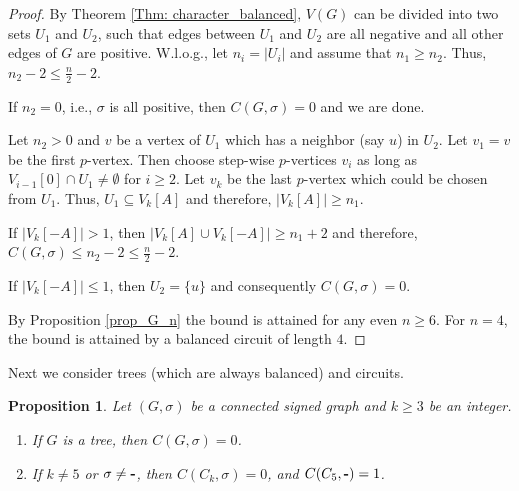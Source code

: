 \documentclass[a4paper,11pt]{article}
\newtheorem{prop}[defi]{Proposition}
\theoremstyle{remark}
\begin{document}
\begin{proof}
    By Theorem \ref{Thm: character_balanced}, $V(G)$ can be divided into two sets $U_1$ and $U_2$, such that edges between $U_1$ and $U_2$ are all negative and 
    all other edges of $G$ are positive. W.l.o.g., let $n_i = |U_i|$ and assume that $n_1 \geq n_2$. Thus, $n_2 - 2 \leq \frac{n}{2}-2$.

    If $n_2 = 0$, i.e., $\sigma$ is all positive, then $C(G,\sigma) = 0$ and we are done. 

    Let $n_2 > 0$ and $v$ be a vertex of $U_1$ which has a neighbor (say $u$) in $U_2$. 
    Let $v_1=v$ be the first $p$-vertex.  
    Then choose step-wise $p$-vertices $v_i$ as long as $V_{i-1}[0]\cap U_1 \neq \emptyset$ for $i\geq 2$. 
    Let $v_k$ be the last $p$-vertex which could be chosen from $U_1$. Thus, 
    $U_1\subseteq V_k[A]$ and therefore, $\vert V_k[A] \vert \geq n_1$. 

    If $\vert V_k[-A] \vert > 1$, then 
    $\vert V_k[A] \cup V_k[-A] \vert \geq n_1 +2$ and therefore,
    $C(G,\sigma) \leq n_2 - 2 \leq \frac{n}{2}-2$.

    If $\vert V_k[-A] \vert \leq 1$, then $U_2=\{u\}$ and consequently $C(G,\sigma) = 0$.
    
    By Proposition \ref{prop_G_n} the bound is attained for any even $n\geq 6$. For $n=4$, 
    the bound is attained by a balanced circuit of length $4$.  
\end{proof}


Next we consider trees (which are always balanced) and circuits. 

\begin{prop} \label{Prop: tree, circuit, vertex}
    Let $(G,\sigma)$ be a connected signed graph and $k \geq 3$ be an integer.
    \begin{enumerate}
        \item If $G$ is a tree, then $C(G,\sigma) = 0$.
        \item If $k \not = 5$ or $\sigma \not = \texttt{\bf -}$, then $C(C_k, \sigma) = 0$, and $C(C_5,\texttt{\bf -})=1$.
    \end{enumerate}
\end{prop}
\end{document}
